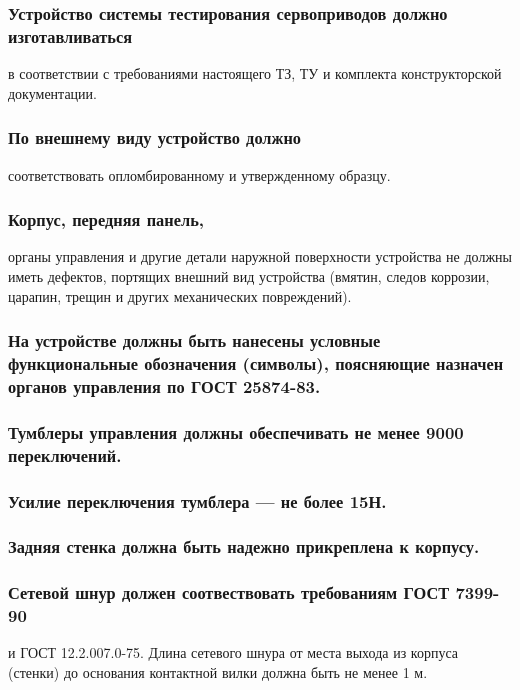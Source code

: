 \documentclass[a4paper]{bsuir-tor}
\begin{document}
  \subsubsection{Устройство системы тестирования сервоприводов должно
    изготавливаться}
  в соответствии с требованиями настоящего ТЗ, ТУ и комплекта конструкторской
  документации.

  \subsubsection{По внешнему виду устройство должно}
  соответствовать опломбированному и утвержденному образцу.
  
  \subsubsection{Корпус, передняя панель, }
  органы управления и другие детали наружной поверхности устройства не
  должны иметь дефектов, портящих внешний вид устройства (вмятин, следов
  коррозии, царапин, трещин и других механических повреждений).
  
  \subsubsection{На устройстве должны быть нанесены условные функциональные 
  обозначения (символы), поясняющие назначен органов управления
  по ГОСТ 25874-83.}
  
  \subsubsection{Тумблеры управления
  должны обеспечивать не менее 9000 переключений.}
  
  \subsubsection{Усилие переключения тумблера — не более 15Н.}
  
  \subsubsection{Задняя стенка должна быть надежно прикреплена к корпусу.}

  \subsubsection{Сетевой шнур должен соотвествовать требованиям ГОСТ 7399-90}
  и ГОСТ 12.2.007.0-75. Длина сетевого шнура от места выхода из корпуса
  (стенки) до основания контактной вилки должна быть не менее 1 м.
  
\end{document}

